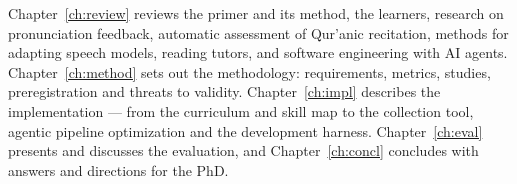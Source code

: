 Chapter~\ref{ch:review} reviews the primer and its method, the learners, research on pronunciation feedback,
automatic assessment of Qur'anic recitation, methods for adapting speech models, reading tutors, and software engineering with AI agents. Chapter~\ref{ch:method} sets out the methodology:
requirements, metrics, studies, preregistration and threats to validity. Chapter~\ref{ch:impl} describes
the implementation --- from the curriculum and skill map to the collection tool, agentic pipeline optimization and the development harness. Chapter~\ref{ch:eval} presents and discusses the evaluation, and
Chapter~\ref{ch:concl} concludes with answers and directions for the PhD.
